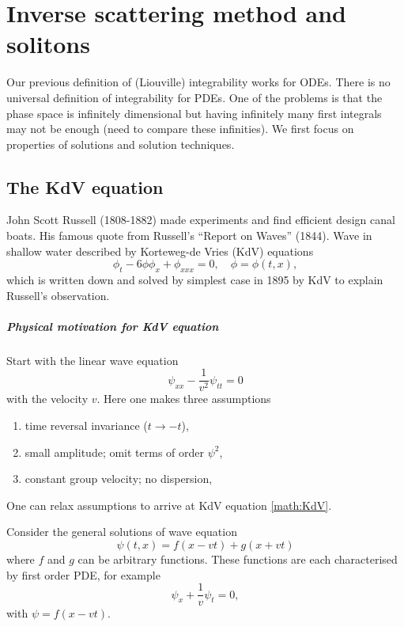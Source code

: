 \chapter{Inverse scattering method and solitons}
Our previous definition of (Liouville) integrability works for ODEs. There is no universal definition of integrability for PDEs. One of the problems is that the phase space is infinitely dimensional but having infinitely many first integrals may not be enough (need to compare these infinities). We first focus on properties of solutions and solution techniques.

\section{The KdV equation}
John Scott Russell (1808-1882) made experiments  and find efficient design canal boats. His famous quote from Russell's ``Report on Waves'' (1844). Wave in shallow water described by Korteweg-de Vries (KdV) equations
\begin{equation}
	\phi_t - 6 \phi \phi_x + \phi_{x x x} = 0, \quad \phi = \phi(t, x),
	\label{math:KdV}
\end{equation}
which is written down and solved by simplest case in 1895 by KdV to explain Russell's observation.

\paragraph{Physical motivation for KdV equation}
Start with the linear wave equation 
\begin{equation*}
	\psi_{x x} - \frac{1}{v^2} \psi_{tt} = 0
\end{equation*}
with the velocity $v$. Here one makes three assumptions
\begin{enumerate}
	\item time reversal invariance ($t \rightarrow -t$),
	\item small amplitude; omit terms of order $\psi^2$,
	\item constant group velocity; no dispersion,
\end{enumerate}
One can relax assumptions to arrive at KdV equation \eqref{math:KdV}.

Consider the general solutions of wave equation
\begin{equation*}
	\psi(t, x) = f(x-vt) + g(x+vt)
\end{equation*}
where $f$ and $g$ can be arbitrary functions. These functions are each characterised by first order PDE, for example
\begin{equation*}
	\psi_x + \frac{1}{v} \psi_t = 0,
\end{equation*}
with $\psi = f(x-vt)$.

